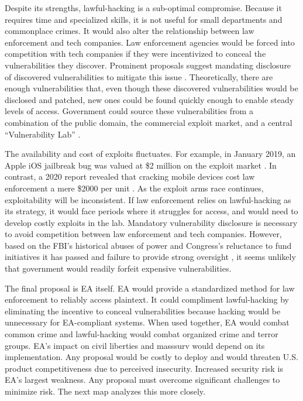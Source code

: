 \documentclass{IEEEtran}
\begin{document}
Despite its strengths, \ac{lawful-hacking} is a sub-optimal compromise. Because it requires time and specialized skills,
it is not useful for small departments and commonplace crimes. It would also alter the relationship between law
enforcement and tech companies. Law enforcement agencies would be forced into competition with tech companies if they
were incentivized to conceal the vulnerabilities they discover. Prominent proposals suggest mandating disclosure of
discovered vulnerabilities to mitigate this issue \cite{bellovin_lawful_2013} \cite{hennessey_lawful_2016}.
Theoretically, there are enough vulnerabilities that, even though these discovered vulnerabilities would be disclosed and
patched, new ones could be found quickly enough to enable steady levels of access. Government could source these
vulnerabilities from a combination of the public domain, the commercial exploit market, and a central ``Vulnerability
Lab'' \cite{bellovin_lawful_2013}.

The availability and cost of exploits fluctuates. For example, in January 2019, an Apple iOS jailbreak bug was valued at
\$2 million on the exploit market \cite{goodin_zeroday_2019}. In contrast, a 2020 report revealed that cracking mobile
devices cost law enforcement a mere \$2000 per unit \cite{koepke_2020}. As the exploit arms race continues,
exploitability will be inconsistent. If law enforcement relies on \ac{lawful-hacking} as its strategy, it would face
periods where it struggles for access, and would need to develop costly exploits in the lab. Mandatory vulnerability
disclosure is necessary to avoid competition between law enforcement and tech companies. However, based on the
\ac{FBI}'s historical abuses of power \cite{shamsi_2011} and Congress's reluctance to fund initiatives it has passed
\cite{keller_internet_2019} and failure to provide strong oversight \cite{johnson_congressional_2004}, it seems unlikely
that government would readily forfeit expensive vulnerabilities.

The final proposal is \ac{EA} itself. \ac{EA} would provide a standardized method for law enforcement to reliably access
\ac{plaintext}. It could compliment \ac{lawful-hacking} by eliminating the incentive to conceal vulnerabilities because
hacking would be unnecessary for \ac{EA}-compliant systems. When used together, \ac{EA} would combat common crime and
\ac{lawful-hacking} would combat organized crime and terror groups. \Ac{EA}'s impact on civil liberties and
\ac{masssurv} would depend on its implementation. Any proposal would be costly to deploy and would threaten U.S. product
competitiveness due to perceived insecurity. Increased security risk is \ac{EA}'s largest weakness. Any proposal must
overcome significant challenges to minimize risk. The next map analyzes this more closely.
\end{document}
